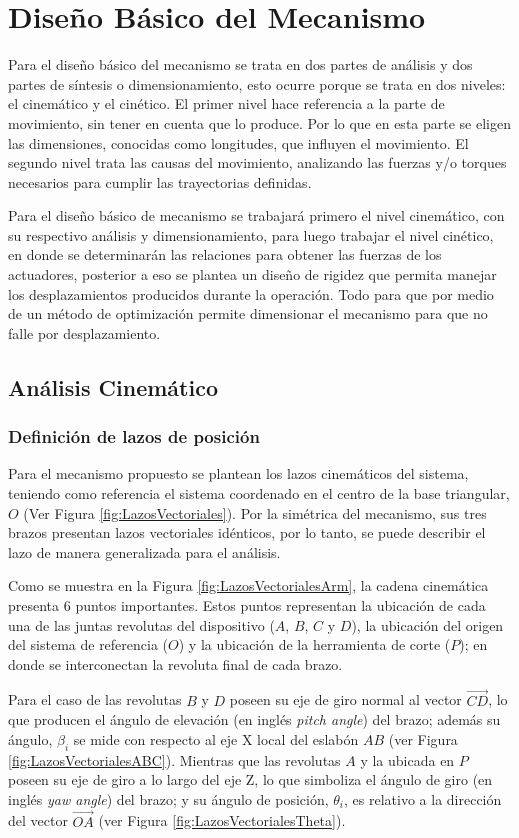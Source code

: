 \section{Diseño Básico del Mecanismo}
Para el diseño básico del mecanismo se trata en dos partes de análisis y dos partes de síntesis o dimensionamiento, esto ocurre porque se trata en dos niveles: el cinemático y el cinético. El primer nivel hace referencia a la parte de movimiento, sin tener en cuenta que lo produce. Por lo que en esta parte se eligen las dimensiones, conocidas como longitudes, que influyen el movimiento. El segundo nivel trata las causas del movimiento, analizando las fuerzas y/o torques necesarios para cumplir las trayectorias definidas.

Para el diseño básico de mecanismo se trabajará primero el nivel cinemático, con su respectivo análisis y dimensionamiento, para luego trabajar el nivel cinético, en donde se determinarán las relaciones para obtener las fuerzas de los actuadores, posterior a eso se plantea un diseño de rigidez que permita manejar los desplazamientos producidos durante la operación. Todo para que por medio de un método de optimización permite dimensionar el mecanismo para que no falle por desplazamiento.

\subsection{Análisis Cinemático}

\subsubsection{Definición de lazos de posición}
Para el mecanismo propuesto se plantean los lazos cinemáticos del sistema, teniendo como referencia el sistema coordenado en el centro de la base triangular, $O$ (Ver Figura \ref{fig:LazosVectoriales}). Por la simétrica del mecanismo, sus tres brazos presentan lazos vectoriales idénticos, por lo tanto, se puede describir el lazo de manera generalizada para el análisis.

Como se muestra en la Figura \ref{fig:LazosVectorialesArm}, la cadena cinemática presenta 6 puntos importantes. Estos puntos representan la ubicación de cada una de las juntas revolutas del dispositivo ($A$, $B$, $C$ y $D$), la ubicación del origen del sistema de referencia ($O$) y la ubicación de la herramienta de corte ($P$); en donde se interconectan la revoluta final de cada brazo.

Para el caso de  las revolutas $B$ y $D$ poseen su eje de giro normal al vector $\vec{CD}$, lo que producen el ángulo de elevación (en inglés \textit{pitch angle}) del brazo; además su ángulo, $\beta_i$ se mide con respecto al eje X local del eslabón $AB$ (ver Figura \ref{fig:LazosVectorialesABC}). Mientras que las revolutas $A$ y la ubicada en $P$ poseen su eje de giro a lo largo del eje Z, lo que simboliza el ángulo de giro (en inglés \textit{yaw angle}) del brazo; y su ángulo de posición, $\theta_i$, es relativo a la dirección del vector $\vec{OA}$ (ver Figura \ref{fig:LazosVectorialesTheta}). 

